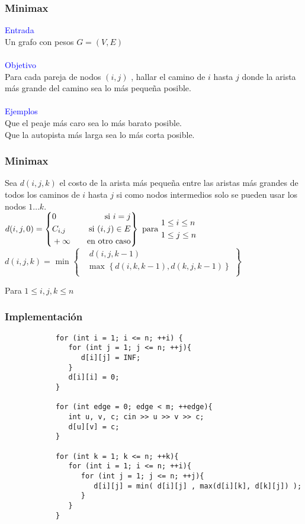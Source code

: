 \documentclass{beamer}
\begin{document}
	\begin{frame}
		\frametitle{Minimax}
		\textcolor{blue}{\large Entrada}\\
		Un grafo con pesos $G = (V, E)$ \\ \quad \\
		\textcolor{blue}{\large Objetivo}\\
		Para cada pareja de nodos $(i, j)$ , hallar el camino de $i$ hasta $j$ donde la arista más grande del camino sea lo más pequeña posible.\\ \quad \\
		\textcolor{blue}{\large Ejemplos}\\
		Que el peaje más caro sea lo más barato posible.\\
		Que la autopista más larga sea lo más corta posible.
	\end{frame}
	
	\begin{frame}
		\frametitle{Minimax}
		Sea $d(i, j, k)$ el costo de la arista más pequeña entre las aristas más grandes de todos los caminos de $i$ hasta $j$ si como nodos intermedios solo se pueden usar los nodos $1 \ldots k$. \\
		\vfill
		$d(i, j, 0) =
		\left\{
			\begin{aligned}
				& 0       &\text{\quad si } i = j\\
				& C_{i,j} &\text{\quad si } (i, j) \in E\\
				& +\infty &\text{\quad en otro caso}
			\end{aligned}
		\right\}
		\text{ para } 
			\begin{aligned}
				& 1 \leq i \leq n\\
				& 1 \leq j \leq n\\
			\end{aligned}
		$
		\vfill
		$d(i, j, k) = \text{ min }
		\left\{
			\begin{aligned}
				& d(i, j, k-1)\\
				& \text{max }\left\{ d(i, k, k-1), d(k, j, k-1) \right\}\\
			\end{aligned}
		\right\}
		$
		\\ \begin{center} Para $ 1 \leq i, j, k \leq n$ \end{center}
	\end{frame}
	
	\begin{frame}[fragile]
		\frametitle{Implementación}
		\begin{lstlisting}
			for (int i = 1; i <= n; ++i) {
			   for (int j = 1; j <= n; ++j){
			      d[i][j] = INF;
			   }
			   d[i][i] = 0;
			}

			for (int edge = 0; edge < m; ++edge){
			   int u, v, c; cin >> u >> v >> c;
			   d[u][v] = c;
			}
			
			for (int k = 1; k <= n; ++k){
			   for (int i = 1; i <= n; ++i){
			      for (int j = 1; j <= n; ++j){
			         d[i][j] = min( d[i][j] , max(d[i][k], d[k][j]) );
			      }
			   }
			}
		\end{lstlisting}
	\end{frame}
	
\end{document}
